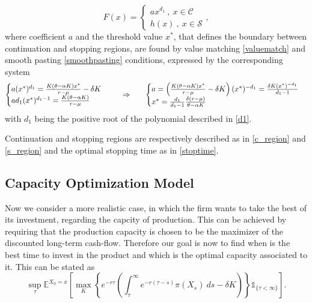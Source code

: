 \begin{equation}
F(x)=\begin{cases} a x^{d_1}  \ , \ x \in \mathcal{C} \\
h(x) \ , \ x \in \mathcal{S}
\end{cases},
\label{1_F}
\end{equation}
where coefficient $a$ and the threshold value $x^*$, that defines the boundary between continuation and stopping regions, are found by value matching \eqref{valuematch} and smooth pasting \eqref{smoothpasting} conditions, expressed by the corresponding system
\begin{equation}
\begin{cases} a(x^*)^{d_1}=\frac{K(\theta-\alpha K) x^*}{r-\mu} - \delta K \\
ad_1(x^*)^{d_1-1}=\frac{K(\theta-\alpha K)}{r-\mu}
\end{cases}
\hspace{5mm} \Rightarrow \ \hspace{5mm}
\begin{cases}
a= \left( \frac{K(\theta-\alpha K) x^*}{r-\mu} - \delta K \right)(x^*)^{-d_1} = \frac{\delta K (x^*)^{-d_1}}{d_1-1}\\
x^*=\frac{d_1}{d_1-1} \frac{ \delta (r-\mu)}{\theta-\alpha K}
\end{cases}
\label{eq:sistema}
\end{equation}
with $d_1$ being the positive root of the polynomial described in \eqref{d1}.

Continuation and stopping regions are respectively described as in \eqref{c_region} and \eqref{s_region} and the optimal stopping time as in \eqref{stoptime}.



\subsection{Capacity Optimization Model}
\label{subsec:1_com}

Now we consider a more realistic case, in which the firm wants to take the best of its investment, regarding the capcity of production. This can be achieved by requiring that the production capacity is chosen to be the maximizer of the discounted long-term cash-flow. Therefore our goal is now to find when is the best time to invest in the product and which is the optimal capacity associated to it. This can be stated as
\begin{equation}
\sup_\tau \mathds{E}^{X_0=x} \left[ \max_K \left\{ e^{-r\tau }  \left( \int_\tau^\infty e^{-r(\tau-s)} \pi(X_s)\ ds -\delta K \right) \right\} \mathds{1}_{\{\tau<\infty\}} \right].
\label{eq:probj}
\end{equation}


